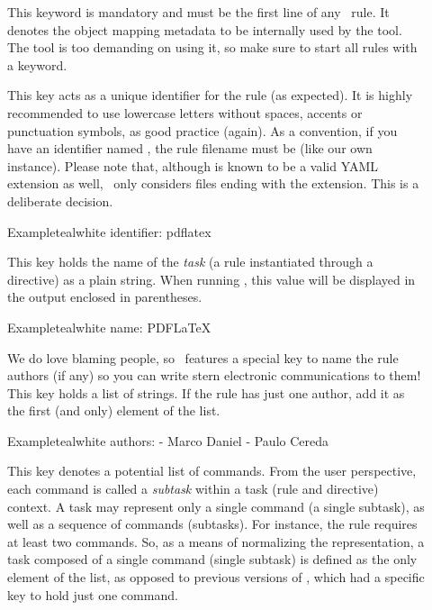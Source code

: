 \begin{description}
\item[] This keyword is mandatory and must be the first line of any \arara\ rule. It denotes the object mapping metadata to be internally used by the tool. The tool is too demanding on using it, so make sure to start all rules with a  keyword.

\item[] This key acts as a unique identifier for the rule (as expected). It is highly recommended to use lowercase letters without spaces, accents or punctuation symbols, as good practice (again). As a convention, if you have an identifier named , the rule filename must be  (like our own instance). Please note that, although  is known to be a valid YAML extension as well, \arara\ only considers files ending with the  extension. This is a deliberate decision.

\begin{codebox}{Example}{teal}{\icnote}{white}
identifier: pdflatex
\end{codebox}

\item[] This key holds the name of the \emph{task} (a rule instantiated through a directive) as a plain string. When running \arara, this value will be displayed in the output enclosed in parentheses.

\begin{codebox}{Example}{teal}{\icnote}{white}
name: PDFLaTeX
\end{codebox}

\item[] We do love blaming people, so \arara\ features a special key to name the rule authors (if any) so you can write stern electronic communications to them! This key holds a list of strings. If the rule has just one author, add it as the first (and only) element of the list.

\begin{codebox}{Example}{teal}{\icnote}{white}
authors:
- Marco Daniel
- Paulo Cereda
\end{codebox}

\item[] This key denotes a potential list of commands. From the user perspective, each command is called a \emph{subtask} within a task (rule and directive) context. A task may represent only a single command (a single subtask), as well as a sequence of commands (subtasks). For instance, the  rule requires at least two commands. So, as a means of normalizing the representation, a task composed of a single command (single subtask) is defined as the only element of the list, as opposed to previous versions of \arara, which had a specific key to hold just one command.


\end{description}
